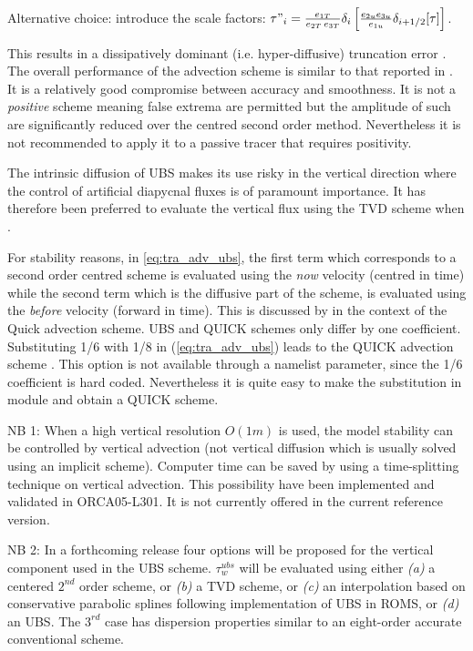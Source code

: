 \documentclass[../main/NEMO_manual]{subfiles}
\begin{document}
Alternative choice: introduce the scale factors:  
$\tau "_i =\frac{e_{1T}}{e_{2T}\,e_{3T}}\delta_i \left[ \frac{e_{2u} e_{3u} }{e_{1u} }\delta_{i+1/2}[\tau] \right]$.

This results in a dissipatively dominant (i.e. hyper-diffusive) truncation error
\citep{Shchepetkin_McWilliams_OM05}.
The overall performance of the advection scheme is similar to that reported in \cite{Farrow1995}.
It is a relatively good compromise between accuracy and smoothness.
It is not a \emph{positive} scheme meaning false extrema are permitted but
the amplitude of such are significantly reduced over the centred second order method.
Nevertheless it is not recommended to apply it to a passive tracer that requires positivity. 

The intrinsic diffusion of UBS makes its use risky in the vertical direction where
the control of artificial diapycnal fluxes is of paramount importance.
It has therefore been preferred to evaluate the vertical flux using the TVD scheme when
.

For stability reasons, in \autoref{eq:tra_adv_ubs}, the first term which corresponds to
a second order centred scheme is evaluated using the \textit{now} velocity (centred in time) while
the second term which is the diffusive part of the scheme, is evaluated using the \textit{before} velocity
(forward in time).
This is discussed by \citet{Webb_al_JAOT98} in the context of the Quick advection scheme.
UBS and QUICK schemes only differ by one coefficient.
Substituting 1/6 with 1/8 in (\autoref{eq:tra_adv_ubs}) leads to the QUICK advection scheme \citep{Webb_al_JAOT98}.
This option is not available through a namelist parameter, since the 1/6 coefficient is hard coded.
Nevertheless it is quite easy to make the substitution in  module and obtain a QUICK scheme.

NB 1: When a high vertical resolution $O(1m)$ is used, the model stability can be controlled by vertical advection
(not vertical diffusion which is usually solved using an implicit scheme).
Computer time can be saved by using a time-splitting technique on vertical advection.
This possibility have been implemented and validated in ORCA05-L301.
It is not currently offered in the current reference version. 

NB 2: In a forthcoming release four options will be proposed for the vertical component used in the UBS scheme.
$\tau_w^{ubs}$ will be evaluated using either \textit{(a)} a centered $2^{nd}$ order scheme,
or \textit{(b)} a TVD scheme, or \textit{(c)} an interpolation based on conservative parabolic splines following
\citet{Shchepetkin_McWilliams_OM05} implementation of UBS in ROMS, or \textit{(d)} an UBS.
The $3^{rd}$ case has dispersion properties similar to an eight-order accurate conventional scheme.
\end{document}
